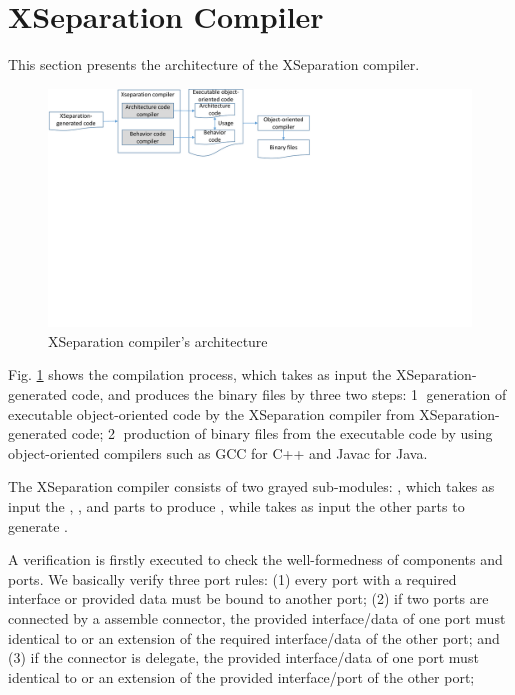 \section{XSeparation Compiler}
\label{sec:compilation}
This section presents the architecture of the XSeparation compiler. %
\begin{figure}
	\centering
	\includegraphics[clip, trim=0cm 13.3cm 12.8cm 0cm, width=\columnwidth]{figures/compilerarchitecture.pdf}
	\caption{XSeparation compiler's architecture} 
	\label{fig:compilerarchitecture}
\end{figure}
Fig. \ref{fig:compilerarchitecture} shows the compilation process, which takes as input the XSeparation-generated code, and produces the binary files by three two steps: \textcircled{1} generation of executable object-oriented code by the XSeparation compiler from XSeparation-generated code; \textcircled{2} production of binary files from the executable code by using object-oriented compilers such as GCC for C++ and Javac for Java.

The XSeparation compiler consists of two grayed sub-modules: , which takes as input the , , and  parts to produce , while  takes as input the other parts to generate . 



\vskip 0.1cm
\noindent
{}
A verification is firstly executed to check the well-formedness of components and ports.
We basically verify three port rules: (1) every port with a required interface or provided data must be bound to another port; (2) if two ports are connected by a assemble connector, the provided interface/data of one port must identical to or an extension of the required interface/data of the other port; and (3) if the connector is delegate, the provided interface/data of one port must identical to or an extension of the provided interface/port of the other port; 

